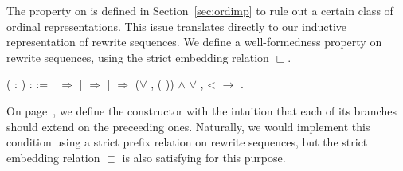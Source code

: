 The  property on
 is defined in
Section~\ref{sec:ordimp} to rule out a
certain class of ordinal representations. This issue translates
directly to our inductive representation of rewrite sequences. We
define a well-formedness property
 on rewrite sequences,
using the strict embedding relation $\sqsubset$.
\begin{singlespace}
\begin{coqdoccode}
\coqdocnoindent
{} 
 
(\coqdocvar{$\varphi$} : 
) : 
:=\coqdoceol
\coqdocindent{1.00em}
 \coqdocvariable{$\varphi$} \coqdoceol
\coqdocindent{1.00em}
\ensuremath{|} 
\coqdocvar{\_}          \ensuremath{\Rightarrow}
\coqdoceol
\coqdocindent{1.00em}
\ensuremath{|} 
\coqdocvar{\_} \coqdocvar{\_} \coqdocvar{$\psi$} \coqdocvar{\_}
\coqdocvar{\_} \ensuremath{\Rightarrow}
\coqdocvariable{\coqdocvariable{$\psi$}}\coqdoceol
\coqdocindent{1.00em}
\ensuremath{|} 
\coqdocvar{\_} \coqdocvar{\_}  \coqdocvar{\_}
\coqdocvar{\_}  \ensuremath{\Rightarrow}
(\ensuremath{\forall} ,
 (
)) \ensuremath{\land}
\ensuremath{\forall}  , 
<  \ensuremath{\rightarrow} 
 \coqdoceol
\coqdocindent{1.00em}
.\coqdoceol
\end{coqdoccode}
\end{singlespace}

On page~\pageref{coq:lim}, we define the
 constructor with the
intuition that each of its branches should extend on the preceeding
ones. Naturally, we would implement this condition using a strict prefix
relation on rewrite sequences, but the strict embedding relation
$\sqsubset$ is also satisfying for this purpose.

